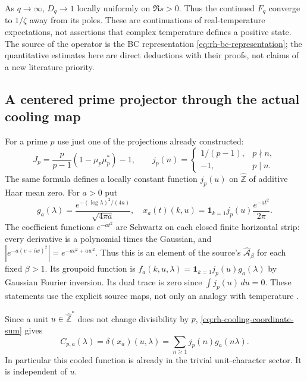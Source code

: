 As $q\to\infty$, $D_q\to1$ locally uniformly on $\Re s>0$.
Thus the continued $F_q$ converge to $1/\zeta$ away from its poles.
These are continuations of real-temperature expectations, not assertions
that complex temperature defines a positive state. The source of the
operator is the BC representation \eqref{eq:rh-bc-representation};
the quantitative estimates here are direct deductions with their proofs,
not claims of a new literature priority.

\subsection{A centered prime projector through the actual cooling map}

For a prime $p$ use just one of the projections already constructed:
\begin{equation}
 J_p=\frac{p}{p-1}(1-\mu_p\mu_p^*)-1,\qquad
 j_p(n)=
 \begin{cases}1/(p-1),&p\nmid n,\\-1,&p\mid n.\end{cases}
 \label{eq:rh-centered-prime}
\end{equation}
The same formula defines a locally constant function $j_p(u)$ on
$\widehat{\mathbb Z}$ of additive Haar mean zero.
For $a>0$ put
\begin{equation}
 g_a(\lambda)=\frac{e^{-(\log\lambda)^2/(4a)}}{\sqrt{4\pi a}},
 \quad
 x_a(t)(k,u)=\mathbf1_{k=1}j_p(u)\frac{e^{-at^2}}{2\pi}.
 \label{eq:rh-gaussian-cooling-input}
\end{equation}
The coefficient functions $e^{-at^2}$ are Schwartz on each closed
finite horizontal strip: every derivative is a polynomial times the
Gaussian, and $|e^{-a(v+iw)^2}|=e^{-av^2+aw^2}$.
Thus this is an element of the source's
$\widehat{\mathcal A}_\beta$ for each fixed $\beta>1$.
Its groupoid function is
$f_a(k,u,\lambda)=\mathbf1_{k=1}j_p(u)g_a(\lambda)$ by Gaussian
Fourier inversion. Its dual trace is zero since $\int j_p(u)\,du=0$.
These statements use the explicit source maps, not only an analogy with
temperature \cite[\S4.4, BC groupoid representation and dual trace]{ccmEndomotives}.

Since a unit $u\in\widehat{\mathbb Z}^*$ does not change divisibility
by $p$, \eqref{eq:rh-cooling-coordinate-sum} gives
\begin{equation}
 C_{p,a}(\lambda)=\delta(x_a)(u,\lambda)
       =\sum_{n\ge1}j_p(n)g_a(n\lambda).
 \label{eq:rh-prime-cooled-function}
\end{equation}
In particular this cooled function is already in the trivial unit-character
sector. It is independent of $u$.

